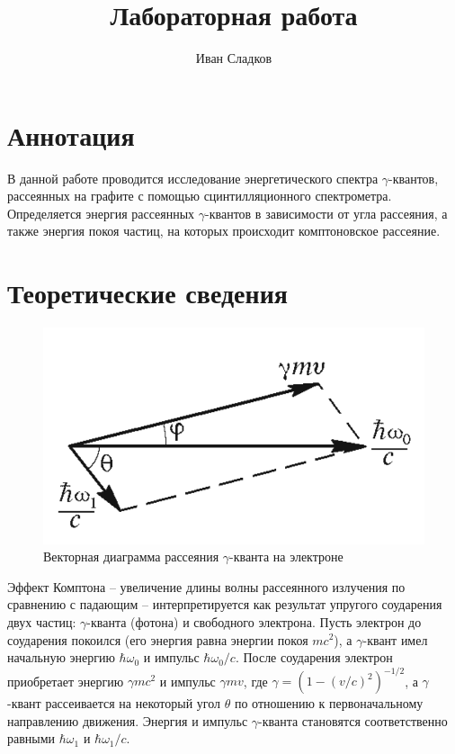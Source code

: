\documentclass[a4paper]{article}
\title{Лабораторная работа \labnum \space \labname}
\author{Иван Сладков}
\newcommand{\gmm}{$\gamma $}
\begin{document}
	\maketitle
	\thispagestyle{empty}
	\section{Аннотация}
	В данной работе проводится исследование энергетического спектра \gmm-квантов, рассеянных на графите с помощью сцинтилляционного спектрометра. Определяется энергия рассеянных \gmm-квантов в зависимости от угла рассеяния, а также энергия покоя частиц, на которых происходит комптоновское рассеяние.
	
	\section{Теоретические сведения}
	
	\begin{figure}
		\includegraphics[width=1.0\linewidth]{Screenshot_1}
		\caption{Векторная диаграмма рассеяния \gmm-кванта на электроне}
		\label{fig:screenshot1}
	\end{figure}

	Эффект Комптона -- увеличение длины волны рассеянного излучения по сравнению с падающим -- интерпретируется как результат упругого соударения двух частиц: \gmm-кванта	(фотона) и свободного электрона. Пусть электрон до соударения покоился (его энергия равна энергии покоя $ m c^2 $), а \gmm-квант имел начальную энергию $ \hbar \omega_0 $ и импульс $ \hbar \omega_0 / c $. После соударения электрон приобретает энергию $ \gamma m c^2 $ и импульс $ \gamma m v $, где $ \gamma = (1- \left(v/c\right)^2)^{-1/2} $, а \gmm-квант рассеивается на некоторый угол $ \theta $ по отношению к первоначальному направлению движения. Энергия и импульс	\gmm-кванта становятся соответственно равными $ \hbar \omega_1 $ и $ \hbar \omega_1 / c $.
	
\end{document}
